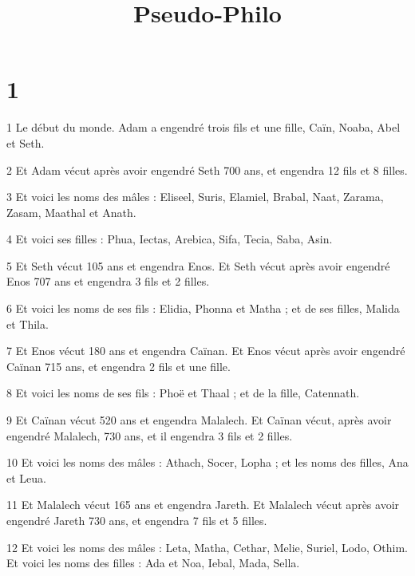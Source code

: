 

\title{Pseudo-Philo}

\chapter{1}

\par 1 Le début du monde. Adam a engendré trois fils et une fille, Caïn, Noaba, Abel et Seth.

\par 2 Et Adam vécut après avoir engendré Seth 700 ans, et engendra 12 fils et 8 filles.

\par 3 Et voici les noms des mâles : Eliseel, Suris, Elamiel, Brabal, Naat, Zarama, Zasam, Maathal et Anath.

\par 4 Et voici ses filles : Phua, Iectas, Arebica, Sifa, Tecia, Saba, Asin.

\par 5 Et Seth vécut 105 ans et engendra Enos. Et Seth vécut après avoir engendré Enos 707 ans et engendra 3 fils et 2 filles.

\par 6 Et voici les noms de ses fils : Elidia, Phonna et Matha ; et de ses filles, Malida et Thila.

\par 7 Et Enos vécut 180 ans et engendra Caïnan. Et Enos vécut après avoir engendré Caïnan 715 ans, et engendra 2 fils et une fille.

\par 8 Et voici les noms de ses fils : Phoë et Thaal ; et de la fille, Catennath.

\par 9 Et Caïnan vécut 520 ans et engendra Malalech. Et Caïnan vécut, après avoir engendré Malalech, 730 ans, et il engendra 3 fils et 2 filles.

\par 10 Et voici les noms des mâles : Athach, Socer, Lopha ; et les noms des filles, Ana et Leua.

\par 11 Et Malalech vécut 165 ans et engendra Jareth. Et Malalech vécut après avoir engendré Jareth 730 ans, et engendra 7 fils et 5 filles.

\par 12 Et voici les noms des mâles : Leta, Matha, Cethar, Melie, Suriel, Lodo, ​​Othim. Et voici les noms des filles : Ada et Noa, Iebal, Mada, Sella.

